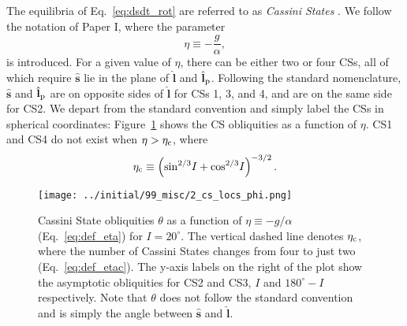 \documentclass[
        fleqn,
        usenatbib,
    ]{mnras}
\newcommand*{\p}[1]{\left(#1\right)}
\newcommand*{\uv}[1]{\hat{\mathbf{#1}}}
\begin{document}
The equilibria of Eq.~\eqref{eq:dsdt_rot} are referred to as \emph{Cassini
States} \citep[CSs;][]{colombo1966, peale1969}. We follow the notation of
Paper I, where the parameter
\begin{equation}
    \eta \equiv -\frac{g}{\alpha},\label{eq:def_eta}
\end{equation}
is introduced. For a given value of $\eta$, there can be either two or four CSs,
all of which require $\uv{s}$ lie in the plane of $\uv{l}$ and $\uv{l}_{\rm p}$.
Following the standard nomenclature, $\uv{s}$ and $\uv{l}_{\rm p}$ are on
opposite sides of $\uv{l}$ for CSs 1, 3, and 4, and are on the same side for
CS2. We depart from the standard convention and simply label the CSs in
spherical coordinates: Figure~\ref{fig:cs_locs} shows the CS obliquities as a
function of $\eta$. CS1 and CS4 do not exist when $\eta > \eta_{\rm c}$, where
\begin{equation}
    \eta_{\rm c} \equiv \p{\sin^{2/3}\!I + \cos^{2/3}\!I}^{-3/2}.
        \label{eq:def_etac}
\end{equation}
\begin{figure}
    \centering
    \texttt{[image: ../initial/99\_misc/2\_cs\_locs\_phi.png]}
    \caption{Cassini State obliquities $\theta$ as a function of $\eta \equiv
    -g/\alpha$ (Eq.~\ref{eq:def_eta}) for $I = 20^\circ$. The vertical dashed
    line denotes $\eta_{\rm c}$, where the number of Cassini States changes from
    four to just two (Eq.~\ref{eq:def_etac}). The y-axis labels on the right of
    the plot show the asymptotic obliquities for CS2 and CS3, $I$ and $180^\circ
    - I$ respectively. Note that $\theta$ does not follow the standard
    convention \citep[e.g.][]{colombo1966} and is simply the angle between
    $\uv{s}$ and $\uv{l}$.}\label{fig:cs_locs}
\end{figure}
\end{document}
